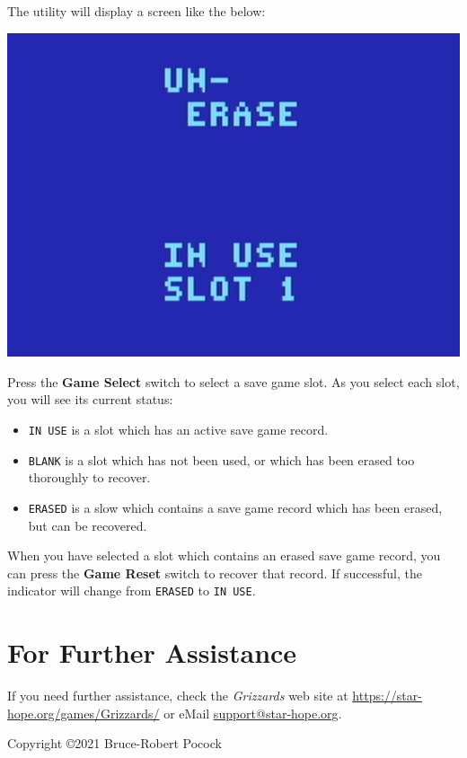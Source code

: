 \documentclass[article]{memoir}
\begin{document}
The utility will display a screen like the below:

\includegraphics[width=\columnwidth]{../Manual/Unerase.png}

Press the \textbf{Game Select} switch to select a save game slot. As you
select each slot, you will see its current status:

\begin{itemize}
\item \texttt{IN USE} is a slot which has an active save game record.
\item \texttt{BLANK}  is a slot  which has not  been used, or  which has
  been erased too thoroughly to recover.
\item \texttt{ERASED} is a slow which  contains a save game record which
  has been erased, but can be recovered.
\end{itemize}

When you have selected a slot which contains an erased save game record,
you can  press the  \textbf{Game Reset} switch  to recover  that record.
If  successful,  the  indicator  will  change  from  \texttt{ERASED}  to
\texttt{IN USE}.

\section*{For Further Assistance}

If you need further assistance, check the \textit{Grizzards} web site at
\href{https://star-hope.org/games/Grizzards/}{https://\-star-hope.org/\-games/\-Grizzards/}
or eMail \href{mailto:support@star-hope.org}{support@star-hope.org}.

\vfill

Copyright \copyright 2021 Bruce-Robert Pocock
\end{document}
